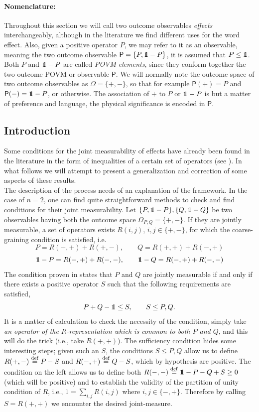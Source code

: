 \documentclass[10pt, a4paper]{amsart}
\begin{document}
\paragraph{\bf Nomenclature:} Throughout this section we will call  two outcome observables \textit{effects} interchangeably, although in the literature we find different uses for the word effect. Also, given a positive operator $P$, we may refer to it as an observable, meaning the two outcome observable $\mathsf{P} = \{P , \bbone - P\}$, it is assumed that $P\leq \bbone$. Both $P$ and $\bbone - P$ are called \textit{ POVM elements}, since they conform together the two outcome POVM or observable $\mathsf{P}$.   We will normally note the outcome space of two outcome observables as $\Omega = \{+,-\}$, so that for example $\mathsf{P}(+) = P$ and $\mathsf{P}(-) = \bbone -P$, or otherwise. The association of $+$ to $P$ or $\bbone - P$ is but a matter of preference and language, the physical significance is encoded in $\mathsf{P}$. 
\subsection{Introduction}
\label{subsec::Comp_introdcution}
Some conditions for the joint measurability of effects have already been found in the literature in the form of inequalities of a certain 
set of operators (see \cite{wolfgarcia}).  In what follows we will attempt to present a generalization and correction of some aspects of these results.  \\

The description of the process needs of an explanation of the framework. In the case of $n=2$, one can find quite straightforward methods to check and find conditions for their joint measurability. Let $\{P, \bbone-P\}, \{Q,\bbone-Q\}$ be two observables having both the outcome space $\Omega_{P,Q} = \{+,-\}$. If they are jointly measurable, a set of operators exists $R(i,j)$, $i,j\in\{+,-\}$, for which the coarse-graining condition is satisfied, i.e.
$$
P = R(+,+) + R(+,-), \qquad Q = R(+,+) + R(-,+)
$$ 
$$
\bbone - P = R(-,+) + R(-,-), \qquad \bbone - Q = R(-,+) + R(-,-)
$$ 
The condition proven in \cite{wolfgarcia} states that $P$ and $Q$ are jointly measurable if and only if there exists a positive operator $S$ such that the following requirements are satisfied, 
\begin{equation}\label{eq:two_effects_conditions}
P+Q- \bbone \leq S , \qquad  S \leq P,Q.
\end{equation}
It is a matter of calculation to check the necessity of the condition, simply take \emph{an operator of the $R$-representation which is common to both $P$ and $Q$}, and this will do the trick (i.e., take $R(+,+)$). The sufficiency condition hides some interesting steps; given such an $S$, the conditions $S\leq P,Q$ allow us to define $R(+,-) \overset{\mathrm{def}}{=} P-S$ and $R(-,+) \overset{\mathrm{def}}{=} Q-S$, which by hypothesis are positive. The condition on the left allows us to define both $R(-,-)\defeq\bbone-P-Q+S \geq 0$ (which will be positive) and to establish the validity of the partition of unity condition of $R$, i.e., $1 = \sum_{i,j} R(i,j)$ where $i,j\in \{-,+\}$. Therefore by calling $S = R(+,+)$ we encounter the desired joint-measure. \\
\end{document}
